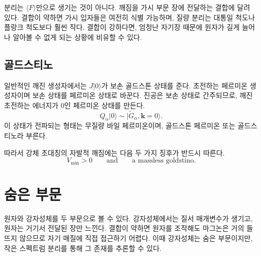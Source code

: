 \begin{classroomqa}
\end{classroomqa}

분리는 \(\langle F\rangle\)만으로 생기는 것이 아니다. 깨짐을 가시 부문 장에 전달하는 결합에 달려 있다. 결합이 약하면 가시 입자들은 여전히 식별 가능하며, 질량 분리는 대통일 척도나 플랑크 척도보다 훨씬 작다. 결합이 강하다면, 엄청난 자기장 때문에 원자가 길게 늘어나 알아볼 수 없게 되는 상황에 비유할 수 있다.

\subsection{골드스티노}

일반적인 깨진 생성자에서는 \(J|0\rangle\)가 보손 골드스톤 상태를 준다. 초전하는 페르미온 생성자이며 보손 상태를 페르미온 상태로 바꾼다. 진공은 보손 상태로 간주되므로, 깨진 초전하는 에너지가 0인 페르미온 상태를 만든다.
\begin{equation}
Q_\alpha|0\rangle
\sim
|\widetilde G_\alpha,\mathbf k=0\rangle.
\label{eq:l9-goldstino}
\end{equation}
이 상태가 전파되는 형태는 무질량 바일 페르미온이며, 골드스톤 페르미온 또는 골드스티노라 부른다.

\begin{classroomqa}
\end{classroomqa}

따라서 강체 초대칭의 자발적 깨짐에는 다음 두 가지 징후가 반드시 따른다.
\begin{equation}
\boxed{
V_{\min}>0
\qquad\text{and}\qquad
\text{a massless goldstino}.
}
\label{eq:l9-rigid-breaking-signatures}
\end{equation}

\section{숨은 부문}

원자와 강자성체를 두 부문으로 볼 수 있다. 강자성체에서는 질서 매개변수가 생기고, 원자는 거기서 전달된 장만 느낀다. 결합이 약하면 원자를 조작해도 마그논은 거의 들뜨지 않으므로 자기 매질에 직접 접근하기 어렵다. 이때 강자성체는 숨은 부문이지만, 작은 스펙트럼 분리를 통해 그 존재를 추론할 수 있다.

